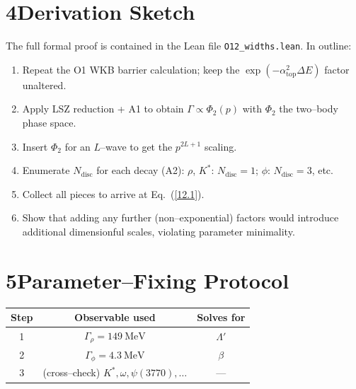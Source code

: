 \documentclass{article}
\begin{document}
\section*{4\quad Derivation Sketch}
The full formal proof is contained in the Lean file
\texttt{O12\_widths.lean}.  In outline:
\begin{enumerate}
  \item Repeat the O1 WKB barrier calculation; keep the
        $\exp(-\alpha_{\text{top}}^{2}\Delta E)$ factor unaltered.
  \item Apply LSZ reduction + A1 to obtain $\Gamma\propto\Phi_2(p)$ with
        $\Phi_2$ the two--body phase space.
  \item Insert $\Phi_2$ for an $L$--wave to get the $p^{2L+1}$ scaling.
  \item Enumerate $N_{\text{disc}}$ for each decay (A2):
        $\rho$, $K^\ast$: $N_{\text{disc}}=1$; $\phi$: $N_{\text{disc}}=3$,
        etc.
  \item Collect all pieces to arrive at Eq.\ (\ref{12.1}).
  \item Show that adding any further (non--exponential) factors would introduce
        additional dimensionful scales, violating parameter minimality.
\end{enumerate}

\section*{5\quad Parameter--Fixing Protocol}
\begin{center}
\begin{tabular}{|c|c|c|}
 \hline
 Step & Observable used & Solves for\\\hline
 1 & $\Gamma_\rho=149\ \text{MeV}$ & $\Lambda'$\\
 2 & $\Gamma_\phi=4.3\ \text{MeV}$ & $\beta$\\
 3 & (cross--check) $K^\ast,\omega,\psi(3770),\dots$ & ---\\\hline
\end{tabular}
\end{center}
\end{document}
